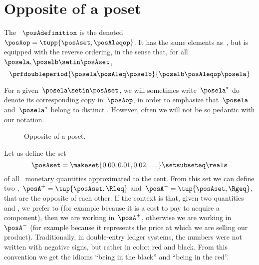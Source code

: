 
\section{Opposite of a poset}\label{sec:opposite-of-a-poset}

\begin{definition}
    \label{def:poset-opposite}
    The ~$\posAdefinition$ is the  denoted~$\posAop=\tupp{\posAset, \posAleqop}$.
    It has the same elements as~\posA, but is equipped with the reverse ordering, in the sense that, for all~$\posela,\poselb \setin \posAset$,
    \begin{equation}\label{eq:poset-opposite}
        \prfdoubleperiod{
            \posela \posAleq \poselb
        }{
            \poselb \posAleqop \posela
        }
    \end{equation}
\end{definition}
For a given~$\posela \setin \posAset$, we will sometimes write~$\posela^*$ do denote its corresponding copy in~$\posAop$, in order to emphasize that~$\posela$ and~$\posela^*$ belong to distinct .
However, often we will not be so pedantic with our notation.

\begin{figure}[tbh]
    \centering
    \caption{
        Opposite of a poset.
    }
    \label{fig:poset-opposite}
\end{figure}

\begin{example}
    Let us define the set
    \begin{equation}\label{eq:credit-debit}
        \posAset=\makeset{0.00,0.01,0.02,\dots}\setsubseteq\reals
    \end{equation}
    of all \CHFneutral \ monetary quantities approximated to the cent.
    From this set we can define two ,~$\posA^{+} = \tup{\posAset, {{\Rleq}}}$ and~$\posA^{-} = \tup{\posAset,{{ \Rgeq}}}$, that are the opposite of each other.
    If the context is that, given two quantities \unit[1]{\CHFneutral} and \unit[2]{\CHFneutral}, we prefer \unit[1]{\CHFneutral} to \unit[2]{\CHFneutral} (for example because it is a cost to pay to acquire a component), then we are working in~$\posA^{+}$, otherwise we are working in~$\posA^{-}$ (for example because it represents the price at which we are selling our product).
    Traditionally, in double-entry ledger systems, the numbers were not written with negative signs, but rather in color: red and black.
    From this convention we get the idioms ``being in the black'' and ``being in the red''.
\end{example}
